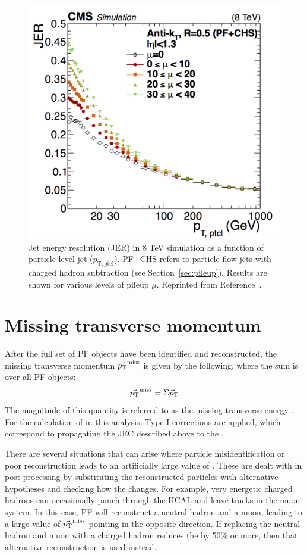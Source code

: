  \begin{figure}[h!]
	\centering
	\includegraphics[width=0.65\linewidth]{Figures/EventReconstruction/JER.png}
       \caption{Jet energy resolution (JER) in 8 TeV simulation as a function of particle-level jet \pt ($p_{\mathrm{T,ptcl}}$). PF+CHS refers to particle-flow
       jets with charged hadron subtraction (see Section~\ref{sec:pileup}). Results are shown for various levels of pileup $\mu$. 
       Reprinted from Reference~\cite{JEC}.}
       \label{fig:JER}
\end{figure}


\section{Missing transverse momentum}
\label{sec:MET_Reco}
After the full set of PF objects have been identified and reconstructed, the missing transverse momentum $\vec{p_{\mathrm{T}}}^{\mathrm{miss}}$ is given by the following, where the sum is over all PF objects:
\begin{equation}
\vec{p_{\mathrm{T}}}^{\mathrm{miss}} = \Sigma {\vec p}_{\mathrm{T}}
\end{equation}
The magnitude of this quantity is referred to as the missing transverse energy \ETmiss. For the calculation of \ETmiss in this analysis, Type-I corrections are applied, which correspond to propagating the JEC described above to the \ETmiss. 

There are several situations that can arise where particle misidentification or poor reconstruction leads to an artificially large value of \ETmiss. These are dealt with in post-processing by substituting the reconstructed particles with alternative hypotheses and checking how the \ETmiss changes. For example, very energetic charged hadrons can occasionally punch through the HCAL and leave tracks in the muon system. In this case, PF will reconstruct a neutral hadron and a muon, leading to a large value of $\vec{p_{\mathrm{T}}}^{\mathrm{miss}}$ pointing in the opposite direction. If replacing the neutral hadron and muon with a charged hadron reduces the \ETmiss by 50\% or more, then that alternative reconstruction is used instead.

